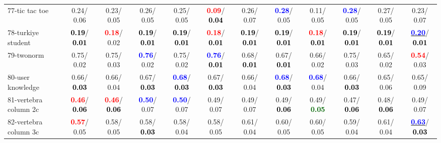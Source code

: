 \begin{table}[h]
\begin{center}
{\begin{tabular}{lc|c|c|c|c|c|c|c|c|c|c}
77-tic tac toe &   0.24/  0.06 &   0.23/  0.05 &   0.26/  0.05 &   0.25/  0.05 & \textcolor{red}{\textbf{  0.09}}/\textcolor{black}{\textbf{  0.04}} &   0.26/  0.07 & \textcolor{blue}{\textbf{  0.28}}/  0.05 &   0.11/  0.05 & \textcolor{blue}{\textbf{  0.28}}/  0.05 &   0.27/  0.05 &   0.23/  0.07 \\
78-turkiye student & \textcolor{black}{\textbf{  0.19}}/\textcolor{black}{\textbf{  0.01}} & \textcolor{red}{\textbf{  0.18}}/  0.02 & \textcolor{black}{\textbf{  0.19}}/\textcolor{black}{\textbf{  0.01}} & \textcolor{black}{\textbf{  0.19}}/\textcolor{black}{\textbf{  0.01}} & \textcolor{red}{\textbf{  0.18}}/\textcolor{black}{\textbf{  0.01}} & \textcolor{black}{\textbf{  0.19}}/\textcolor{black}{\textbf{  0.01}} & \textcolor{black}{\textbf{  0.19}}/\textcolor{black}{\textbf{  0.01}} & \textcolor{red}{\textbf{  0.18}}/\textcolor{black}{\textbf{  0.01}} & \textcolor{black}{\textbf{  0.19}}/\textcolor{black}{\textbf{  0.01}} & \textcolor{black}{\textbf{  0.19}}/\textcolor{black}{\textbf{  0.01}} & \underline{\textcolor{blue}{\textbf{  0.20}}}/\textcolor{black}{\textbf{  0.01}} \\ \hline
79-twonorm &   0.75/  0.02 &   0.75/  0.03 & \textcolor{blue}{\textbf{  0.76}}/  0.02 &   0.75/  0.02 & \textcolor{blue}{\textbf{  0.76}}/\textcolor{black}{\textbf{  0.01}} &   0.68/\textcolor{black}{\textbf{  0.01}} &   0.67/\textcolor{black}{\textbf{  0.01}} &   0.66/  0.02 &   0.75/  0.03 &   0.65/  0.02 & \textcolor{red}{\textbf{  0.54}}/  0.03 \\
80-user knowledge &   0.66/\textcolor{black}{\textbf{  0.03}} &   0.66/  0.04 &   0.67/\textcolor{black}{\textbf{  0.03}} & \textcolor{blue}{\textbf{  0.68}}/\textcolor{black}{\textbf{  0.03}} &   0.67/\textcolor{black}{\textbf{  0.03}} &   0.66/  0.04 & \textcolor{blue}{\textbf{  0.68}}/\textcolor{black}{\textbf{  0.03}} & \textcolor{blue}{\textbf{  0.68}}/  0.04 &   0.66/\textcolor{black}{\textbf{  0.03}} &   0.65/  0.06 &   0.65/  0.09 \\
81-vertebra column 2c & \textcolor{red}{\textbf{  0.46}}/\textcolor{black}{\textbf{  0.06}} & \textcolor{red}{\textbf{  0.46}}/\textcolor{black}{\textbf{  0.06}} & \textcolor{blue}{\textbf{  0.50}}/  0.07 & \textcolor{blue}{\textbf{  0.50}}/  0.07 &   0.49/  0.07 &   0.49/  0.07 &   0.49/\textcolor{black}{\textbf{  0.06}} &   0.49/\textcolor{darkgreen}{\textbf{  0.05}} &   0.47/\textcolor{black}{\textbf{  0.06}} &   0.48/\textcolor{black}{\textbf{  0.06}} &   0.49/  0.07 \\
82-vertebra column 3c & \textcolor{red}{\textbf{  0.57}}/  0.05 &   0.58/  0.05 &   0.58/\textcolor{black}{\textbf{  0.03}} &   0.58/  0.04 &   0.58/  0.05 &   0.61/  0.04 &   0.60/  0.05 &   0.60/  0.05 &   0.59/  0.04 &   0.61/  0.04 & \underline{\textcolor{blue}{\textbf{  0.63}}}/\textcolor{black}{\textbf{  0.03}} \\

\end{tabular}}
\end{center}
\end{table}
